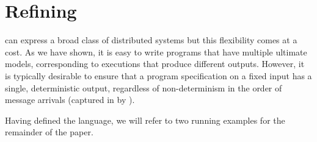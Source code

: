 \section{Refining \large \bf \lang}
\label{sec:confluence}


\lang can express a broad class of distributed systems but this flexibility comes at a cost.
As we have shown, it is easy to write programs that have multiple ultimate models, 
corresponding to executions that produce different outputs.
However, it is typically desirable to ensure that a program specification on a fixed input has a single, deterministic output, regardless of non-determinism in the order of message arrivals (captured in \lang by ).  

Having defined the \lang language, we will refer to two running examples for the remainder of the paper.  

